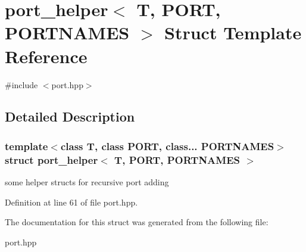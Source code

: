 \hypertarget{structport__helper}{}\section{port\+\_\+helper$<$ T, P\+O\+RT, P\+O\+R\+T\+N\+A\+M\+ES $>$ Struct Template Reference}
\label{structport__helper}


{\ttfamily \#include $<$port.\+hpp$>$}



\subsection{Detailed Description}
\subsubsection*{template$<$class T, class P\+O\+RT, class... P\+O\+R\+T\+N\+A\+M\+ES$>$\newline
struct port\+\_\+helper$<$ T, P\+O\+R\+T, P\+O\+R\+T\+N\+A\+M\+E\+S $>$}

some helper structs for recursive port adding 

Definition at line 61 of file port.\+hpp.



The documentation for this struct was generated from the following file\+:\begin{DoxyCompactItemize}
\item 
port.\+hpp\end{DoxyCompactItemize}
